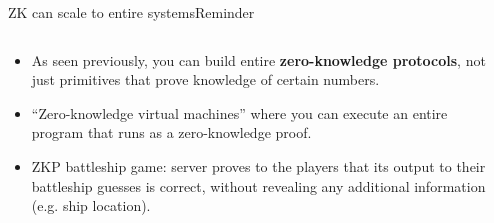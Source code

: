 \documentclass[aspectratio=169, lualatex, handout]{beamer}
\begin{document}
\begin{frame}{ZK can scale to entire systems}{Reminder}
	\begin{columns}[c]
		\begin{column}{0.6\textwidth}
			\begin{itemize}[<+->]
				\item As seen previously, you can build entire \textbf{zero-knowledge protocols}, not just primitives that prove knowledge of certain numbers.
				\item ``Zero-knowledge virtual machines'' where you can execute
				      an entire program that runs as a zero-knowledge proof.
				\item ZKP battleship game: server proves to the players that its
				      output to their battleship guesses is correct, without revealing any
				      additional information (e.g. ship location).
			\end{itemize}
		\end{column}

		\begin{column}{0.4\textwidth}
		\end{column}
	\end{columns}
\end{frame}
\end{document}
